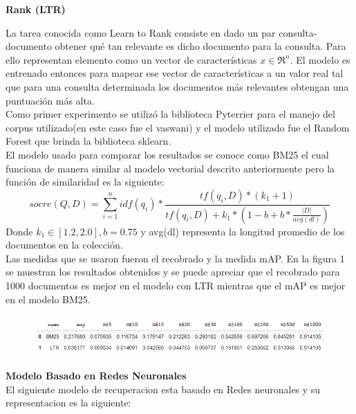 \documentclass[runningheads]{llncs}
\begin{document}
\textbf{Rank (LTR)}

La tarea conocida como Learn to Rank consiste en dado un par consulta-documento obtener qué tan relevante es dicho documento para la consulta. Para ello representan elemento como un vector de características $x \in \Re^{n}$. El modelo es entrenado entonces para mapear ese vector de características a un valor real tal que para una consulta determinada los documentos más relevantes obtengan una puntuación más alta. \\
Como primer experimento se utilizó la biblioteca Pyterrier para el manejo del corpus utilizado(en este caso fue el vaswani) y el modelo utilizado fue el Random Forest que brinda la biblioteca sklearn.\\
El modelo usado para comparar los resultados se conoce como BM25 el cual funciona de manera similar al modelo vectorial descrito anteriormente pero la función de similaridad es la siguiente:
\begin{equation}
socre(Q,D)= \sum_{i=1}^{n}idf(q_{i}) * \frac{tf(q_{i},D)*(k_{1}+1)}{tf(q_{i},D)+k_{1}* (1-b+b*\frac{\vert D\vert}{avg(dl)})}
\end{equation}
Donde $k_{1}\in [1.2,2.0], b = 0.75$ y avg(dl) representa la longitud promedio de los documentos en la colección.\\
Las medidas que se usaron fueron el recobrado y la medida mAP. En la figura 1 se muestran los resultados obtenidos y se puede apreciar que el recobrado para 1000 documentos es mejor en el modelo con LTR mientras que el mAP es mejor en el modelo BM25.\\


\begin{figure}[htb]
\centering
\includegraphics[width=1\textwidth]{Capture.png}
\label{fig:tigre}
\end{figure} 


\textbf{Modelo Basado en Redes Neuronales}\\
El siguiente modelo de recuperacion esta basado en Redes neuronales y su representacion es la siguiente:
\end{document}
